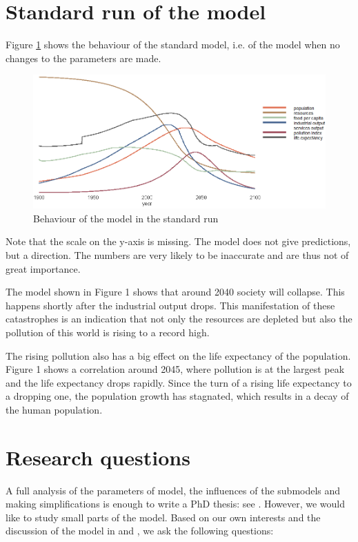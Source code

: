 \documentclass[10pt,a4paper]{scrartcl}
\begin{document}
\section*{Standard run of the model}

Figure \ref{standard-run} shows the behaviour of the standard model, i.e. of the model when no changes to the parameters are made.

\begin{figure}
\centering
\includegraphics[width=\textwidth]{./plaatjes/standard-run.png}
\caption{Behaviour of the model in the standard run}
\label{standard-run}
\end{figure}

Note that the scale on the y-axis is missing. The model does not give predictions, but a direction. The numbers are very likely to be inaccurate and are thus not of great importance.

The model shown in Figure 1 shows that around 2040 society will collapse. This happens shortly after the industrial output drops. This manifestation of these catastrophes is an indication that not only the resources are depleted but also the pollution of this world is rising to a record high.

The rising pollution also has a big effect on the life expectancy of the population. Figure 1 shows a correlation around 2045, where pollution is at the largest peak and the life expectancy drops rapidly. Since the turn of a rising life expectancy to a dropping one, the population growth has stagnated, which results in a decay of the human population.

\section*{Research questions}

A full analysis of the parameters of model, the influences of the submodels and making simplifications is enough to write a PhD thesis: see \cite{thissen1978investigations}. However, we would like to study small parts of the model. Based on our own interests and the discussion of the model in \cite{thissen1978investigations} and \cite{vermeulen1976parameter}, we ask the following questions:
\end{document}
